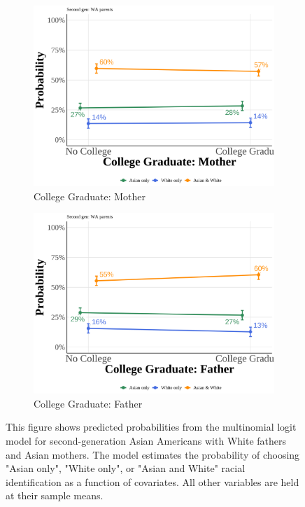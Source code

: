 \begin{center}
\begin{figure}[!htb]
\vspace{0.5cm}

\begin{subfigure}{.48\textwidth}
\caption{College Graduate: Mother}
\centering
\includegraphics[width=1\linewidth]{simple_pp_MomGradCollege_second_wa.png}
\end{subfigure}
\hfill
\begin{subfigure}{.48\textwidth}
\caption{College Graduate: Father}
\centering
\includegraphics[width=1\linewidth]{simple_pp_DadGradCollege_second_wa.png}
\end{subfigure}

\caption*{\footnotesize{This figure shows predicted probabilities from the multinomial logit model for second-generation Asian Americans with White fathers and Asian mothers. The model estimates the probability of choosing "Asian only", "White only", or "Asian and White" racial identification as a function of covariates. All other variables are held at their sample means.}}
\end{figure}
\end{center}

